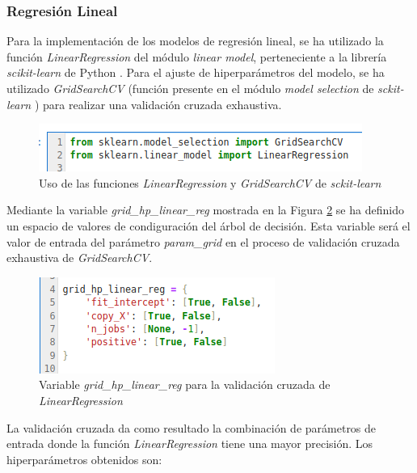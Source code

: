 \documentclass[12pt,a4paper,Spanish]{article}
\begin{document}
\subsubsection{Regresión Lineal}
Para la implementación de los modelos de regresión lineal, se ha utilizado la función \textit{LinearRegression} del módulo \textit{linear model}, perteneciente a la librería \textit{scikit-learn} de Python \cite{scikit-learn}.
\newline
Para el ajuste de hiperparámetros del modelo, se ha utilizado \textit{GridSearchCV} (función presente en el módulo \textit{model selection} de \textit{sckit-learn} \cite{scikit-learn}) para realizar una validación cruzada exhaustiva.
\begin{figure}[H]
	\centering
	\includegraphics[width=0.7\linewidth]{figs/import_linear_reg}
	\caption{Uso de las funciones \textit{LinearRegression} y \textit{GridSearchCV} de \textit{sckit-learn}}
	\label{fig:importlinearreg}
\end{figure}
Mediante la variable \textit{grid\_hp\_linear\_reg} mostrada en la Figura \ref{fig:paramslinearreg} se ha definido un espacio de valores de condiguración del árbol de decisión. Esta variable será el valor de entrada del parámetro \textit{param\_grid} en el proceso de validación cruzada exhaustiva de \textit{GridSearchCV}.
\begin{figure}[H]
	\centering
	\includegraphics[width=0.7\linewidth]{figs/params_linear_reg}
	\caption{Variable \textit{grid\_hp\_linear\_reg} para la validación cruzada de \textit{LinearRegression}}
	\label{fig:paramslinearreg}
\end{figure}
La validación cruzada da como resultado la combinación de parámetros de entrada donde la función \textit{LinearRegression} tiene una mayor precisión. Los hiperparámetros obtenidos son:
\end{document}
